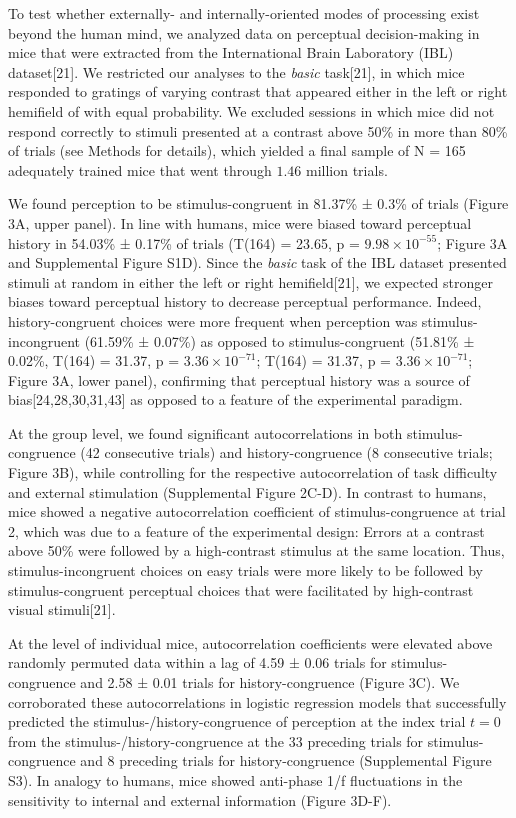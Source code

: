 \documentclass[
]{article}
\begin{document}
To test whether externally- and internally-oriented modes of processing
exist beyond the human mind, we analyzed data on perceptual
decision-making in mice that were extracted from the International Brain
Laboratory (IBL) dataset{[}21{]}. We restricted our analyses to the
\emph{basic} task{[}21{]}, in which mice responded to gratings of
varying contrast that appeared either in the left or right hemifield of
with equal probability. We excluded sessions in which mice did not
respond correctly to stimuli presented at a contrast above 50\% in more
than 80\% of trials (see Methods for details), which yielded a final
sample of N = 165 adequately trained mice that went through \(1.46\)
million trials.

We found perception to be stimulus-congruent in 81.37\% ± 0.3\% of
trials (Figure 3A, upper panel). In line with humans, mice were biased
toward perceptual history in 54.03\% ± 0.17\% of trials (T(164) = 23.65,
p = \(\ensuremath{9.98\times 10^{-55}}\); Figure 3A and Supplemental
Figure S1D). Since the \emph{basic} task of the IBL dataset presented
stimuli at random in either the left or right hemifield{[}21{]}, we
expected stronger biases toward perceptual history to decrease
perceptual performance. Indeed, history-congruent choices were more
frequent when perception was stimulus-incongruent (61.59\% ± 0.07\%) as
opposed to stimulus-congruent (51.81\% ± 0.02\%, T(164) = 31.37, p =
\(\ensuremath{3.36\times 10^{-71}}\); T(164) = 31.37, p =
\(\ensuremath{3.36\times 10^{-71}}\); Figure 3A, lower panel),
confirming that perceptual history was a source of
bias{[}24,28,30,31,43{]} as opposed to a feature of the experimental
paradigm.

At the group level, we found significant autocorrelations in both
stimulus-congruence (42 consecutive trials) and history-congruence (8
consecutive trials; Figure 3B), while controlling for the respective
autocorrelation of task difficulty and external stimulation
(Supplemental Figure 2C-D). In contrast to humans, mice showed a
negative autocorrelation coefficient of stimulus-congruence at trial 2,
which was due to a feature of the experimental design: Errors at a
contrast above 50\% were followed by a high-contrast stimulus at the
same location. Thus, stimulus-incongruent choices on easy trials were
more likely to be followed by stimulus-congruent perceptual choices that
were facilitated by high-contrast visual stimuli{[}21{]}.

At the level of individual mice, autocorrelation coefficients were
elevated above randomly permuted data within a lag of 4.59 ± 0.06 trials
for stimulus-congruence and 2.58 ± 0.01 trials for history-congruence
(Figure 3C). We corroborated these autocorrelations in logistic
regression models that successfully predicted the
stimulus-/history-congruence of perception at the index trial \(t = 0\)
from the stimulus-/history-congruence at the 33 preceding trials for
stimulus-congruence and 8 preceding trials for history-congruence
(Supplemental Figure S3). In analogy to humans, mice showed anti-phase
1/f fluctuations in the sensitivity to internal and external information
(Figure 3D-F).
\end{document}
